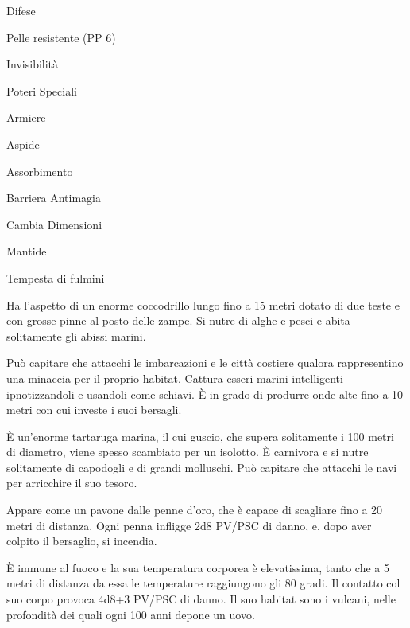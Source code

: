 \begin{parmostro}{Difese}
\item Pelle resistente (PP 6) 
\item Invisibilit\`a
\end{parmostro}

\begin{parmostro}{Poteri Speciali}
\item Armiere
\item Aspide
\item Assorbimento
\item Barriera Antimagia
\item Cambia Dimensioni
\item Mantide 
\item Tempesta di fulmini
\end{parmostro}


Ha l'aspetto di un enorme coccodrillo lungo fino a 15 metri dotato di
due teste e con grosse pinne al posto delle zampe. Si nutre di alghe e
pesci e abita solitamente gli abissi marini. 

Pu\`o capitare che
attacchi le imbarcazioni e le citt\`a costiere qualora rappresentino
una minaccia per il proprio habitat. Cattura esseri marini
intelligenti ipnotizzandoli e usandoli come schiavi. \`E in grado di
produrre onde alte fino a 10 metri con cui investe i suoi bersagli.


\`E un'enorme tartaruga marina, il cui guscio, che supera solitamente
i 100 metri di diametro, viene spesso scambiato per un isolotto. \`E
carnivora e si nutre solitamente di capodogli e di grandi molluschi.
Pu\`o capitare che attacchi le navi per arricchire il suo tesoro.


Appare come un pavone dalle penne d'oro, che \`e capace di scagliare
fino a 20 metri di distanza. Ogni penna infligge 2d8 PV/PSC di danno,
e, dopo aver colpito il bersaglio, si incendia.

\`E immune al fuoco e la sua temperatura corporea \`e elevatissima,
tanto che a 5 metri di distanza da essa le temperature raggiungono gli
80 gradi. Il contatto col suo corpo provoca 4d8+3 PV/PSC di danno. Il
suo habitat sono i vulcani, nelle profondit\`a dei quali ogni 100
anni depone un uovo.

